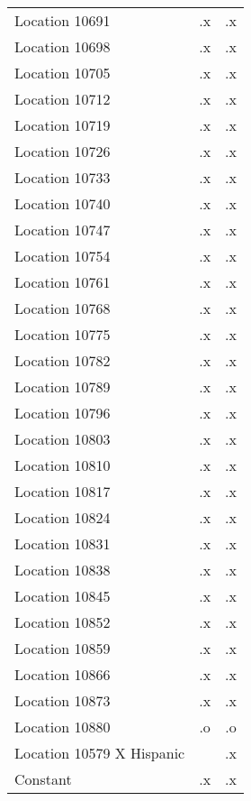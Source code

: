 \begin{tabular}{l*{2}{c}}
Location 10691      &          .x&          .x\\
Location 10698      &          .x&          .x\\
Location 10705      &          .x&          .x\\
Location 10712      &          .x&          .x\\
Location 10719      &          .x&          .x\\
Location 10726      &          .x&          .x\\
Location 10733      &          .x&          .x\\
Location 10740      &          .x&          .x\\
Location 10747      &          .x&          .x\\
Location 10754      &          .x&          .x\\
Location 10761      &          .x&          .x\\
Location 10768      &          .x&          .x\\
Location 10775      &          .x&          .x\\
Location 10782      &          .x&          .x\\
Location 10789      &          .x&          .x\\
Location 10796      &          .x&          .x\\
Location 10803      &          .x&          .x\\
Location 10810      &          .x&          .x\\
Location 10817      &          .x&          .x\\
Location 10824      &          .x&          .x\\
Location 10831      &          .x&          .x\\
Location 10838      &          .x&          .x\\
Location 10845      &          .x&          .x\\
Location 10852      &          .x&          .x\\
Location 10859      &          .x&          .x\\
Location 10866      &          .x&          .x\\
Location 10873      &          .x&          .x\\
Location 10880      &          .o&          .o\\
Location 10579 X Hispanic&            &          .x\\
Constant            &          .x&          .x\\
\hline\hline
\end{tabular}
